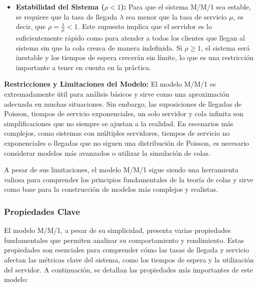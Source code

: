 \documentclass{article}
\begin{document}
\begin{itemize}
    \item \textbf{Estabilidad del Sistema (\( \rho < 1 \)):} 
    Para que el sistema M/M/1 sea estable, se requiere que la tasa de llegada \( \lambda \) sea menor que la tasa de servicio \( \mu \), es decir, que \( \rho = \frac{\lambda}{\mu} < 1 \). Este supuesto implica que el servidor es lo suficientemente rápido como para atender a todos los clientes que llegan al sistema sin que la cola crezca de manera indefinida. Si \( \rho \geq 1 \), el sistema será inestable y los tiempos de espera crecerán sin límite, lo que es una restricción importante a tener en cuenta en la práctica.
\end{itemize}

 \textbf{Restricciones y Limitaciones del Modelo:}
El modelo M/M/1 es extremadamente útil para análisis básicos y sirve como una aproximación adecuada en muchas situaciones. Sin embargo, las suposiciones de llegadas de Poisson, tiempos de servicio exponenciales, un solo servidor y cola infinita son simplificaciones que no siempre se ajustan a la realidad. En escenarios más complejos, como sistemas con múltiples servidores, tiempos de servicio no exponenciales o llegadas que no siguen una distribución de Poisson, es necesario considerar modelos más avanzados o utilizar la simulación de colas.

A pesar de sus limitaciones, el modelo M/M/1 sigue siendo una herramienta valiosa para comprender los principios fundamentales de la teoría de colas y sirve como base para la construcción de modelos más complejos y realistas.

\subsubsection{Propiedades Clave}

El modelo M/M/1, a pesar de su simplicidad, presenta varias propiedades fundamentales que permiten analizar su comportamiento y rendimiento. Estas propiedades son esenciales para comprender cómo las tasas de llegada y servicio afectan las métricas clave del sistema, como los tiempos de espera y la utilización del servidor. A continuación, se detallan las propiedades más importantes de este modelo:
\end{document}
